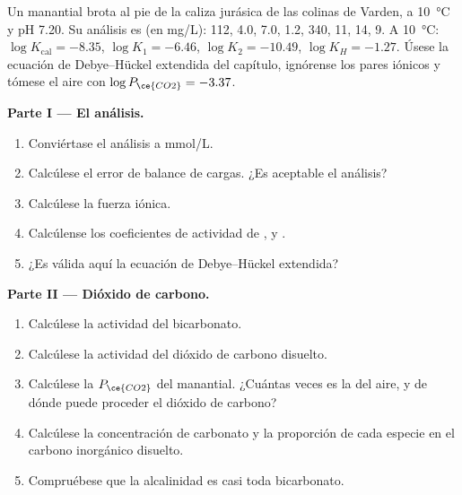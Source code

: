 \begin{problem}
\label{pb:b3:water-rock-interaction:1}
Un manantial brota al pie de la caliza jurásica de las colinas de Varden, a
\qty{10}{\celsius} y pH 7.20. Su análisis es (en \unit{mg/L}): 
112,  4.0,  7.0,  1.2,  340,  11,
 14,  9. A \qty{10}{\celsius}: $\log K_{\mathrm{cal}} =
-8.35$, $\log K_1 = -6.46$, $\log K_2 = -10.49$, $\log K_H = -1.27$. Úsese la
ecuación de Debye--Hückel extendida del capítulo, ignórense los pares iónicos y tómese
el aire con $\log P_{\ce{CO2}} = -3.37$.

\medskip\noindent\textbf{Parte I --- El análisis.}
\begin{enumerate}
\item Conviértase el análisis a \unit{mmol/L}.
\item Calcúlese el error de balance de cargas. ¿Es aceptable el análisis?
\item Calcúlese la fuerza iónica.
\item Calcúlense los coeficientes de actividad de ,  y
  .
\item ¿Es válida aquí la ecuación de Debye--Hückel extendida?
\end{enumerate}

\medskip\noindent\textbf{Parte II --- Dióxido de carbono.}
\begin{enumerate}[resume]
\item Calcúlese la actividad del bicarbonato.
\item Calcúlese la actividad del dióxido de carbono disuelto.
\item Calcúlese la $P_{\ce{CO2}}$ del manantial. ¿Cuántas veces es la del
  aire, y de dónde puede proceder el dióxido de carbono?
\item Calcúlese la concentración de carbonato y la proporción de cada especie en
  el carbono inorgánico disuelto.
\item Compruébese que la alcalinidad es casi toda bicarbonato.
\end{enumerate}


\end{problem}
